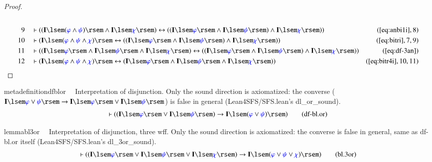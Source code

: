 \begin{proof}
\begin{align}
  \\ 9 &&  & \vdash ( ( \mathbf{I} \lsem ( \mw{\varphi} \wedge \mw{\psi} )
      \rsem \wedge \mathbf{I} \lsem \mw{\chi} \rsem )
      \leftrightarrow ( ( \mathbf{I} \lsem \mw{\varphi}
      \rsem \wedge \mathbf{I} \lsem \mw{\psi} \rsem )
      \wedge \mathbf{I} \lsem \mw{\chi} \rsem )
      )&(\mbox{\ref{eq:anbi1i}},8)\notag
  \\ 10 &&  & \vdash ( \mathbf{I} \lsem ( \mw{\varphi} \wedge \mw{\psi} \wedge
      \mw{\chi} ) \rsem \leftrightarrow ( ( \mathbf{I}
      \lsem \mw{\varphi} \rsem \wedge \mathbf{I} \lsem
      \mw{\psi} \rsem ) \wedge \mathbf{I} \lsem \mw{\chi}
      \rsem ) )&(\mbox{\ref{eq:bitri}},7,9)\notag
  \\ 11 &&  & \vdash ( ( \mathbf{I} \lsem \mw{\varphi} \rsem \wedge \mathbf{I}
      \lsem \mw{\psi} \rsem \wedge \mathbf{I} \lsem
      \mw{\chi} \rsem ) \leftrightarrow ( ( \mathbf{I}
      \lsem \mw{\varphi} \rsem \wedge \mathbf{I} \lsem
      \mw{\psi} \rsem ) \wedge \mathbf{I} \lsem \mw{\chi}
      \rsem ) )&(\mbox{\ref{eq:df-3an}})\notag
  \\ 12 &&  & \vdash ( \mathbf{I} \lsem ( \mw{\varphi} \wedge \mw{\psi} \wedge
      \mw{\chi} ) \rsem \leftrightarrow ( \mathbf{I} \lsem
      \mw{\varphi} \rsem \wedge \mathbf{I} \lsem \mw{\psi}
      \rsem \wedge \mathbf{I} \lsem \mw{\chi} \rsem )
      )&(\mbox{\ref{eq:bitr4i}},10,11)\notag
\end{align}
\end{proof}

\begin{restatable}{metadefinition}{dfblor}~~ Interpretation of disjunction.  Only
the sound direction is axiomatized: the converse
($\mathbf{I}\lsem\mw{\varphi}\vee\mw{\psi}\rsem \rightarrow
\mathbf{I}\lsem\mw{\varphi}\rsem\vee\mathbf{I}\lsem\mw{\psi}\rsem$) is false
in general (Lean4SFS/SFS.lean's dl\_or\_sound).
\begin{align}
\vdash ( ( \mathbf{I} \lsem \mw{\varphi} \rsem \vee \mathbf{I} \lsem \mw{\psi}
    \rsem ) \rightarrow \mathbf{I} \lsem ( \mw{\varphi} \vee \mw{\psi} ) \rsem
    )\label{eq:df-bl.or}\tag{df-bl.or}
\end{align}
\end{restatable}

\begin{restatable}{lemma}{bl3or}~~ Interpretation of disjunction, three wff.  Only the
sound direction is axiomatized: the converse is false in general, same as
df-bl.or itself (Lean4SFS/SFS.lean's dl\_3or\_sound).
\begin{align}
\vdash ( ( \mathbf{I} \lsem \mw{\varphi} \rsem \vee \mathbf{I} \lsem \mw{\psi}
    \rsem \vee \mathbf{I} \lsem \mw{\chi} \rsem ) \rightarrow \mathbf{I} \lsem
    ( \mw{\varphi} \vee \mw{\psi} \vee \mw{\chi} ) \rsem
    )\label{eq:bl.3or}\tag{bl.3or}
\end{align}
\end{restatable}

